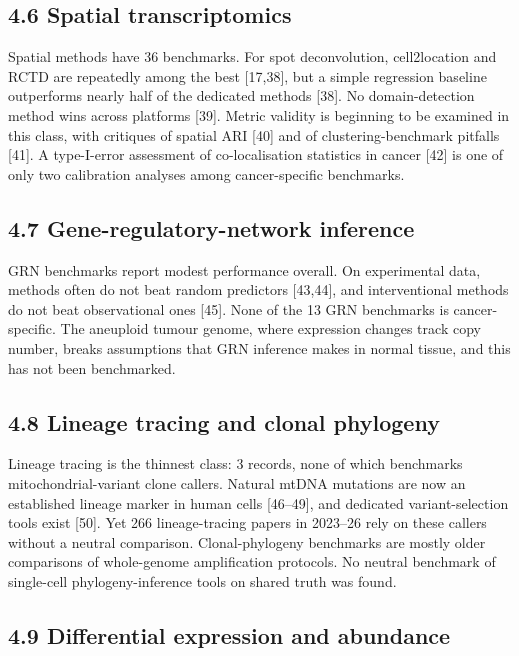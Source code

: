 \documentclass[11pt]{article}
\begin{document}
\subsection{4.6 Spatial transcriptomics}\label{spatial-transcriptomics}

Spatial methods have 36 benchmarks. For spot deconvolution,
cell2location and RCTD are repeatedly among the best {[}17,38{]}, but a
simple regression baseline outperforms nearly half of the dedicated
methods {[}38{]}. No domain-detection method wins across platforms
{[}39{]}. Metric validity is beginning to be examined in this class,
with critiques of spatial ARI {[}40{]} and of clustering-benchmark
pitfalls {[}41{]}. A type-I-error assessment of co-localisation
statistics in cancer {[}42{]} is one of only two calibration analyses
among cancer-specific benchmarks.

\subsection{4.7 Gene-regulatory-network inference}\label{gene-regulatory-network-inference}

GRN benchmarks report modest performance overall. On experimental data,
methods often do not beat random predictors {[}43,44{]}, and
interventional methods do not beat observational ones {[}45{]}. None of
the 13 GRN benchmarks is cancer-specific. The aneuploid tumour genome,
where expression changes track copy number, breaks assumptions that GRN
inference makes in normal tissue, and this has not been benchmarked.

\subsection{4.8 Lineage tracing and clonal phylogeny}\label{lineage-tracing-and-clonal-phylogeny}

Lineage tracing is the thinnest class: 3 records, none of which
benchmarks mitochondrial-variant clone callers. Natural mtDNA mutations
are now an established lineage marker in human cells {[}46--49{]}, and
dedicated variant-selection tools exist {[}50{]}. Yet 266
lineage-tracing papers in 2023--26 rely on these callers without a
neutral comparison. Clonal-phylogeny benchmarks are mostly older
comparisons of whole-genome amplification protocols. No neutral
benchmark of single-cell phylogeny-inference tools on shared truth was
found.

\subsection{4.9 Differential expression and abundance}\label{differential-expression-and-abundance}
\end{document}
